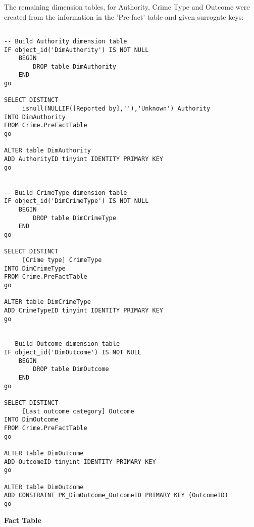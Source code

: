 \documentclass{article}
\begin{document}
The remaining dimension tables, for Authority, Crime Type and Outcome were created from the information in the 'Pre-fact' table and given surrogate keys:
\begin{lstlisting}

-- Build Authority dimension table
IF object_id('DimAuthority') IS NOT NULL 
	BEGIN 
		DROP table DimAuthority
	END
go

SELECT DISTINCT 
	 isnull(NULLIF([Reported by],''),'Unknown') Authority
INTO DimAuthority 
FROM Crime.PreFactTable
go

ALTER table DimAuthority
ADD AuthorityID tinyint IDENTITY PRIMARY KEY
go


-- Build CrimeType dimension table
IF object_id('DimCrimeType') IS NOT NULL 
	BEGIN 
		DROP table DimCrimeType
	END
go

SELECT DISTINCT 
	 [Crime type] CrimeType
INTO DimCrimeType 
FROM Crime.PreFactTable
go

ALTER table DimCrimeType
ADD CrimeTypeID tinyint IDENTITY PRIMARY KEY
go


-- Build Outcome dimension table
IF object_id('DimOutcome') IS NOT NULL 
	BEGIN 
		DROP table DimOutcome
	END
go

SELECT DISTINCT 
	 [Last outcome category] Outcome
INTO DimOutcome 
FROM Crime.PreFactTable
go

ALTER table DimOutcome
ADD OutcomeID tinyint IDENTITY PRIMARY KEY
go

ALTER table DimOutcome
ADD CONSTRAINT PK_DimOutcome_OutcomeID PRIMARY KEY (OutcomeID)
go

\end{lstlisting}
\bigskip

\noindent
\textbf{Fact Table}
\end{document}

